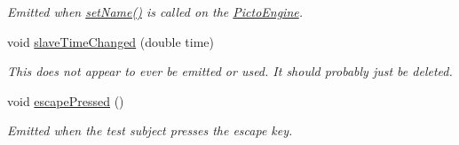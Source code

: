\begin{DoxyCompactItemize}
\begin{DoxyCompactList}\small\item\em Emitted when \hyperlink{class_picto_1_1_engine_1_1_picto_engine_a0e83fe6c9e2769d97d3d7a5fffcbec5b}{set\-Name()} is called on the \hyperlink{class_picto_1_1_engine_1_1_picto_engine}{Picto\-Engine}. \end{DoxyCompactList}\item 
\hypertarget{class_picto_1_1_engine_1_1_picto_engine_a4a5d44f20340896ef122d10c92688ec7}{void \hyperlink{class_picto_1_1_engine_1_1_picto_engine_a4a5d44f20340896ef122d10c92688ec7}{slave\-Time\-Changed} (double time)}\label{class_picto_1_1_engine_1_1_picto_engine_a4a5d44f20340896ef122d10c92688ec7}

\begin{DoxyCompactList}\small\item\em This does not appear to ever be emitted or used. It should probably just be deleted. \end{DoxyCompactList}\item 
void \hyperlink{class_picto_1_1_engine_1_1_picto_engine_ad45f2ecdd6895db562c1ada2931821a3}{escape\-Pressed} ()
\begin{DoxyCompactList}\small\item\em Emitted when the test subject presses the escape key. \end{DoxyCompactList}\end{DoxyCompactItemize}
